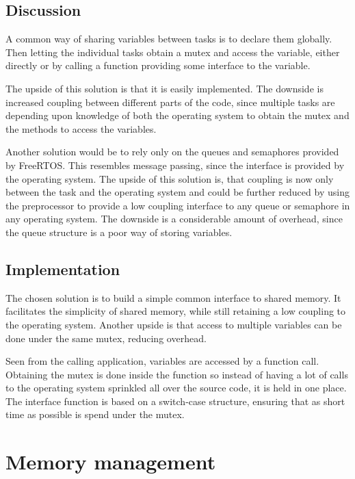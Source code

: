 \subsection{Discussion}
A common way of sharing variables between tasks is to declare them globally.
Then letting the individual tasks obtain a mutex and access the variable, either
directly or by calling a function providing some interface to the variable.

The upside of this solution is that it is easily implemented. The downside is
increased coupling between different parts of the code, since multiple tasks are
depending upon knowledge of both the operating system to obtain the mutex and
the methods to access the variables.

Another solution would be to rely only on the queues and semaphores provided by
FreeRTOS. This resembles message passing, since the interface is provided by the
operating system. The upside of this solution is, that coupling is now only
between the task and the operating system and could be further reduced by using
the preprocessor to provide a low coupling interface to any queue or semaphore
in any operating system. The downside is a considerable amount of overhead,
since the queue structure is a poor way of storing variables.

\subsection{Implementation}
The chosen solution is to build a simple common interface to shared memory. It
facilitates the simplicity of shared memory, while still retaining a low
coupling to the operating system. Another upside is that access to multiple
variables can be done under the same mutex, reducing overhead.

Seen from the calling application, variables are accessed by a function call.
Obtaining the mutex is done inside the function so instead of having a lot of
calls to the operating system sprinkled all over the source code, it is held in
one place. The interface function is based on a switch-case structure, ensuring
that as short time as possible is spend under the mutex.


\section{Memory management}\label{sec:memoryman}

